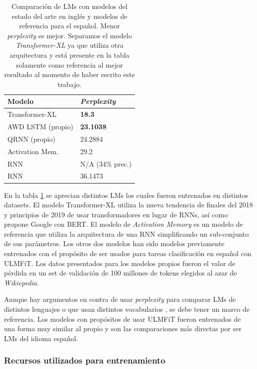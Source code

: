 \begin{table}
\centering
\begin{tabular}{|l|l|}
\hline
\textbf{Modelo} & \textbf{\textit{Perplexity}} \\
\hline
Transformer-XL \parencite{dai2019} & \textbf{18.3} \\
\hline
AWD LSTM (propio) & \textbf{23.1038} \\
QRNN (propio) & 24.2884 \\
Activation Mem. \parencite{rae2018} & 29.2 \\
RNN \parencite{goldszmidt2018} & N/A (34\% prec.) \\
RNN \parencite{ingham2018} & 36.1473 \\
\hline

\end{tabular}
\caption{Comparación de LMs con modelos del estado del arte en inglés y modelos de referencia para el español. Menor \textit{perplexity} es mejor. Separamos el modelo \textit{Transformer-XL} ya que utiliza otra arquitectura y está presente en la tabla solamente como referencia al mejor resultado al momento de haber escrito este trabajo.}
\label{tab:lmcomp}
\end{table}

En la tabla \ref{tab:lmcomp} se aprecian distintos LMs los cuales fueron entrenados en distintos datasets. El modelo Transformer-XL \parencite{dai2019} utiliza la nueva tendencia de finales del 2018 y principios de 2019 de usar transformadores en lugar de RNNs, así como propone Google con BERT. El modelo de \textit{Activation Memory} \parencite{rae2018} es un modelo de referencia que utiliza la arquitectura de una RNN simplificando un sub-conjunto de sus parámetros. Los otros dos modelos han sido modelos previamente entrenados con el propósito de ser usados para tareas clasificación en español con ULMFiT. Los datos presentados para los modelos propios fueron el valor de pérdida en un set de validación de 100 millones de tokens elegidos al azar de \textit{Wikiepedia}.

Aunque hay argumentos en contra de usar \textit{perplexity} para comparar LMs de distintos lenguajes o que usan distintos vocabularios \parencite{chen1998evaluation}, se debe tener un marco de referencia. Los modelos con propósitos de usar ULMFiT fueron entrenados de una forma muy similar al propio y son las comparaciones más directas por ser LMs del idioma español.


\subsubsection{Recursos utilizados para entrenamiento}

